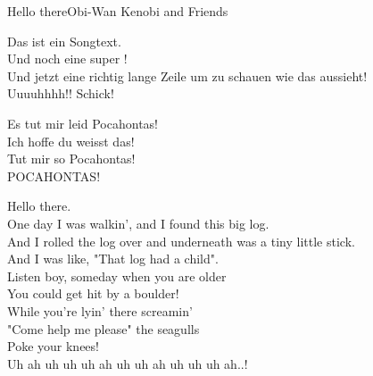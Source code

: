 \begin{song}{Hello there}{Obi-Wan Kenobi and Friends}
    Das ist ein  Songtext. \\
    Und noch eine super ! \\
    Und jetzt eine richtig lange Zeile um zu schauen wie das aussieht! \\
    Uuuuhhhh!! Schick!
    \begin{chorus}
    Es tut mir leid Pocahontas! \\
    Ich hoffe du weisst das! \\
    Tut mir so  Pocahontas! \\
    POCAHONTAS!
    \end{chorus}
    Hello there. \\

    One day I was walkin', and I found this big log. \\
    And I rolled the log over and underneath was a tiny little stick. \\
    And I was like, "That log had a child". \\

    Listen boy, someday when you are older \\
    You could get hit by a boulder! \\
    While you're lyin' there screamin' \\
    "Come help me please" the seagulls \\

    Poke your knees! \\

    Uh ah uh uh uh ah uh uh ah uh uh uh ah..!
\end{song}
